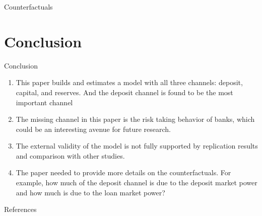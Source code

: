 \documentclass{beamer}
\begin{document}
\begin{frame}{Counterfactuals}

    \begin{table}
    \end{table}
\end{frame}

\section{Conclusion}
\begin{frame}{Conclusion}
    \begin{enumerate}
        \item This paper builds and estimates a model with all three channels: deposit, capital, and reserves. And the deposit channel is found to be the most important channel
        \item The missing channel in this paper is the risk taking behavior of banks, which could be an interesting avenue for future research.
        \item The external validity of the model is not fully supported by replication results and comparison with other studies.
        \item The paper needed to provide more details on the counterfactuals. For example, how much of the deposit channel is due to the deposit market power and how much is due to the loan market power?
    \end{enumerate}
\end{frame}


\scriptsize 
\begin{frame}[allowframebreaks]{References}
    
    
\end{frame}
	
\normalsize
\end{document}
